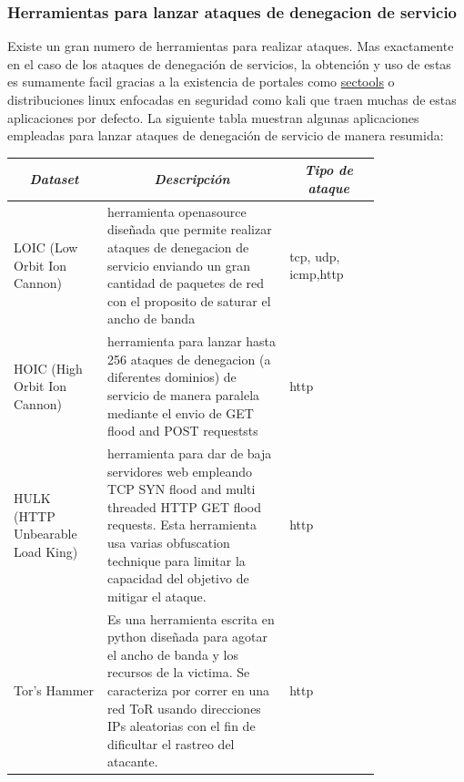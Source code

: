 \documentclass[12pt]{article}
\begin{document}
\newpage
{}
\recalctypearea

\FloatBarrier

\subsubsection{Herramientas para lanzar ataques de denegacion de servicio}

Existe un gran numero de herramientas para realizar ataques. Mas exactamente en el caso de los ataques de denegación de servicios, la obtención y uso de estas es sumamente facil gracias a la existencia de portales como \href{http://sectools.org/}{sectools} o distribuciones linux enfocadas en seguridad como kali que traen muchas de estas aplicaciones por defecto. La siguiente tabla \citep{dos_tools} muestran algunas aplicaciones empleadas para lanzar ataques de denegación de servicio de manera resumida:

\begin{table}[htbp]
\centering
\begin{tabular}{|p{0.2\linewidth}|p{0.4\linewidth}|p{0.2\linewidth}|}
\hline
\multicolumn{1}{|c|}{\textit{\textbf{Dataset}}} & \multicolumn{1}{c|}{\textit{\textbf{Descripción}}} & \multicolumn{1}{c|}{\textit{\textbf{Tipo de ataque}}} \tabularnewline \hline
LOIC (Low Orbit Ion Cannon) & herramienta openasource diseñada que
permite realizar ataques de denegacion de servicio enviando un gran cantidad de paquetes de red con el proposito de saturar el ancho de banda & tcp, udp, icmp,http \tabularnewline \hline
HOIC (High Orbit Ion Cannon) & herramienta para lanzar hasta 256 ataques de denegacion (a diferentes dominios) de servicio de manera paralela mediante el envio de GET flood and POST requeststs & http \tabularnewline \hline
HULK (HTTP Unbearable Load King) & herramienta para dar de baja servidores web empleando TCP SYN flood and multi threaded HTTP GET flood requests. Esta herramienta usa varias obfuscation technique para limitar la capacidad del objetivo de mitigar el ataque. & http \tabularnewline \hline
Tor’s Hammer & Es una herramienta escrita en python diseñada para agotar el ancho de banda y los recursos de la victima. Se caracteriza por correr en una red ToR usando direcciones IPs aleatorias con el fin de dificultar el rastreo del atacante. & http \tabularnewline \hline
\end{tabular}
\end{table}
\end{document}
